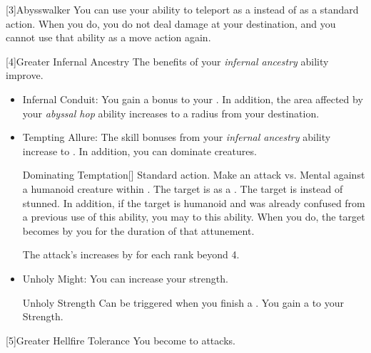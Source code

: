     [3]{Abysswalker} You can use your  ability to teleport as a  instead of as a standard action.
      When you do, you do not deal damage at your destination, and you  cannot use that ability as a move action again.

    [4]{Greater Infernal Ancestry} The benefits of your \textit{infernal ancestry} ability improve.
      \begin{itemize}
        \item Infernal Conduit: You gain a  bonus to your .
          In addition, the area affected by your \textit{abyssal hop} ability increases to a \smallarea radius from your destination.
        \item Tempting Allure: The skill bonuses from your \textit{infernal ancestry} ability increase to .
          In addition, you can dominate creatures.
          \begin{magicalactiveability}{Dominating Temptation}[]
            \abilityusagetime Standard action.
            \rankline
            Make an attack vs. Mental against a humanoid creature within \shortrange.
            \hit The target is \stunned as a .
            \crit The target is \confused instead of stunned.
            In addition, if the target is humanoid and was already confused from a previous use of this ability, you may  to this ability.
            When you do, the target becomes \dominated by you for the duration of that attunement.

            \rankline
            \noindent The attack's  increases by  for each rank beyond 4.
          \end{magicalactiveability}
        \item Unholy Might: You can increase your strength.
          \begin{magicalattuneability}{Unholy Strength}{}
            \abilityusagetime Can be triggered when you finish a .
            \rankline
            You gain a   to your Strength.
          \end{magicalattuneability}
      \end{itemize}

    [5]{Greater Hellfire Tolerance} You become  to \atFire attacks.

